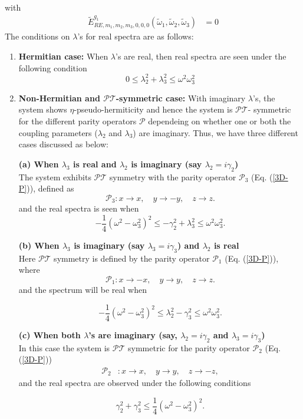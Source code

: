 \documentclass[a4paper, 12pt]{article}
\newcommand{\td}[1]{\tilde{#1}}
\begin{document}
with
\begin{align}
	\td{E}^{q_1}_{RE,m_1,m_2,m_3,0,0,0}(\td{\omega}_1,\td{\omega}_2,\td{\omega}_3)&=0
\end{align}
The conditions on $\lambda$'s for real spectra are as follows:
\begin{enumerate}
  \item {\bf Hermitian case:} When $\lambda$'s are real, then real spectra are seen under the following condition
  \begin{equation}\label{cond-3D-r-1}
      0 \leq \lambda_2^2 + \lambda_3^2 \leq \omega^2 \omega_3^2
  \end{equation}   

  \item {\bf Non-Hermitian and $\mathcal{PT}$-symmetric case:} With imaginary $\lambda$'s, the system shows $\eta$-pseudo-hermiticity and hence the system is $\mathcal{PT}$- symmetric for the different parity operators $\mathcal{P}$ dependeing on whether one or both the coupling parameters ($\lambda_2$ and $\lambda_3$) are imaginary. Thus, we have three different cases discussed as below:  
  
    {\bf (a) When $\lambda_3$ is real and $\lambda_2$ is imaginary (say $\lambda_2=i\gamma_2$)}\\ 	
    The system exhibits \(\mathcal{PT}\) symmetry with the parity operator \(\mathcal{P}_{3}\) (Eq. (\ref{3D-P})), defined as 
    \[\mathcal{P}_{3} : x \rightarrow x, \quad y \rightarrow -y, \quad z \rightarrow z.\] and the real spectra is seen when \\
    \[-\frac{1}{4}(\omega^2-\omega_3^2)^2 \leq -\gamma_2^2 + \lambda_3^2 \leq \omega^2 \omega_3^2.\]
    
    {\bf (b) When $\lambda_3$ is imaginary (say $\lambda_3=i\gamma_3$) and $\lambda_2$ is real}\\ 
     Here \(\mathcal{PT}\) symmetry is defined by the parity operator \(\mathcal{P}_{1}\) (Eq. (\ref{3D-P})), where 
    \[\mathcal{P}_{1} : x \rightarrow -x, \quad y \rightarrow y, \quad z \rightarrow z.\]
    and the spectrum will be real when

    \[-\frac{1}{4}(\omega^2-\omega_3^2)^2 \leq \lambda_2^2 - \gamma_3^2 \leq \omega^2 \omega_3^2.\]

  { \bf (c) When both $\lambda$'s are imaginary (say, $\lambda_2=i\gamma_2$ and $\lambda_3=i\gamma_3$)}\\
  	In this case the system is $\mathcal{PT}$ symmetric for the parity operator \(\mathcal{P}_{2}\) (Eq. (\ref{3D-P}))
  	\begin{align*}
  		\mathcal{P}_2& : x \rightarrow x, \quad y \rightarrow y, \quad z \rightarrow -z,
  	\end{align*}
  		 and the real spectra are observed under the following conditions
  
  \[ \gamma_2^2 + \gamma_3^2\leq\frac{1}{4}(\omega^2-\omega_3^2)^2.\]
   \end{enumerate}
\end{document}
